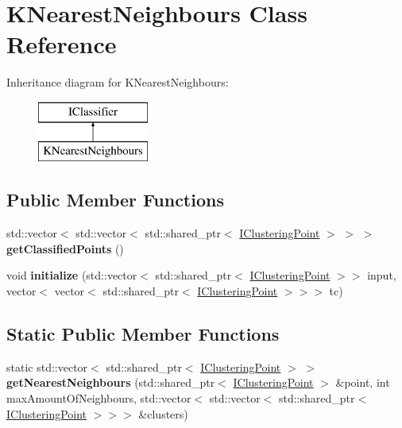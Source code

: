 \hypertarget{classKNearestNeighbours}{}\section{K\+Nearest\+Neighbours Class Reference}
\label{classKNearestNeighbours}
Inheritance diagram for K\+Nearest\+Neighbours\+:\begin{figure}[H]
\begin{center}
\leavevmode
\includegraphics[height=2.000000cm]{classKNearestNeighbours}
\end{center}
\end{figure}
\subsection*{Public Member Functions}
\begin{DoxyCompactItemize}
\item 
\mbox{\label{classKNearestNeighbours_a7c479602bf4f949916345ec39a96ea82}} 
std\+::vector$<$ std\+::vector$<$ std\+::shared\+\_\+ptr$<$ \hyperlink{classIClusteringPoint}{I\+Clustering\+Point} $>$ $>$ $>$ {\bfseries get\+Classified\+Points} ()
\item 
\mbox{\label{classKNearestNeighbours_a22bd79b738fe1af311586dfc1bb311bf}} 
void {\bfseries initialize} (std\+::vector$<$ std\+::shared\+\_\+ptr$<$ \hyperlink{classIClusteringPoint}{I\+Clustering\+Point} $>$$>$ input, vector$<$ vector$<$ std\+::shared\+\_\+ptr$<$ \hyperlink{classIClusteringPoint}{I\+Clustering\+Point} $>$$>$$>$ tc)
\end{DoxyCompactItemize}
\subsection*{Static Public Member Functions}
\begin{DoxyCompactItemize}
\item 
\mbox{\label{classKNearestNeighbours_a5c9ecb63d9e5f61789b417c363a27bd8}} 
static std\+::vector$<$ std\+::shared\+\_\+ptr$<$ \hyperlink{classIClusteringPoint}{I\+Clustering\+Point} $>$ $>$ {\bfseries get\+Nearest\+Neighbours} (std\+::shared\+\_\+ptr$<$ \hyperlink{classIClusteringPoint}{I\+Clustering\+Point} $>$ \&point, int max\+Amount\+Of\+Neighbours, std\+::vector$<$ std\+::vector$<$ std\+::shared\+\_\+ptr$<$ \hyperlink{classIClusteringPoint}{I\+Clustering\+Point} $>$$>$$>$ \&clusters)
\end{DoxyCompactItemize}


